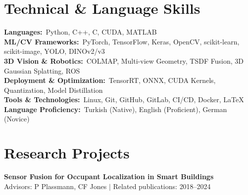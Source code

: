 \documentclass[letterpaper,11pt]{article}
\begin{document}
\section{Technical \& Language Skills}
 \begin{itemize}[leftmargin=0.15in, label={}]
    \small{\item{
     \textbf{Languages:}{~Python, C++, C, CUDA, MATLAB} \\
	 \textbf{ML/CV Frameworks:}{~PyTorch, TensorFlow, Keras, OpenCV, scikit-learn, scikit-image, YOLO, DINOv2/v3} \\
	 \textbf{3D Vision \& Robotics:}{~COLMAP, Multi-view Geometry, TSDF Fusion, 3D Gaussian Splatting, ROS} \\
	 \textbf{Deployment \& Optimization:}{~TensorRT, ONNX, CUDA Kernels, Quantization, Model Distillation} \\
     \textbf{Tools \& Technologies:}{~Linux, Git, GitHub, GitLab, CI/CD, Docker, \LaTeX} \\
	 \textbf{Language Proficiency:}{~Turkish (Native), English (Proficient), German (Novice)}
    }}
 \end{itemize}
 \vspace{-16pt}

\section{Research Projects}
    \vspace{-5pt}
    \resumeSubHeadingListStart
		\resumeProjectHeading
		{
			\textbf{Sensor Fusion for Occupant Localization in Smart Buildings} \\
			\qquad \small Advisors: P Plassmann, CF Jones $|$ Related publications: \cite{ambarkutuk2024sensors,ambarkutuk2023,ambarkutuk2021uncertainty,sa2021investigation,sa2020towards}
		}
		{2018--2024}
		\resumeItemListStart
          \resumeItemListEnd
		\vspace{-13pt}
\end{document}
